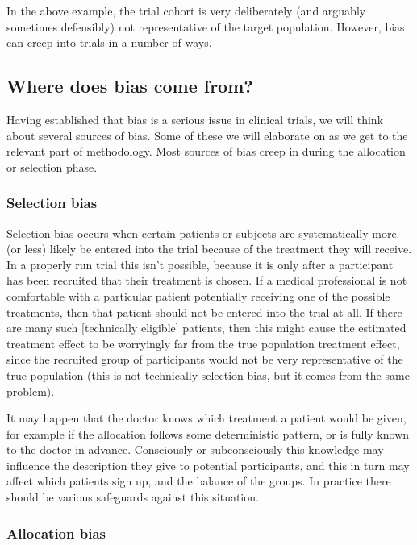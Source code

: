 \documentclass[
  openany]{book}
\theoremstyle{definition}
\theoremstyle{definition}
\theoremstyle{definition}
\theoremstyle{definition}
\theoremstyle{remark}
\begin{document}
In the above example, the trial cohort is very deliberately (and arguably sometimes defensibly) not representative of the target population. However, bias can creep into trials in a number of ways.

\subsection{Where does bias come from?}\label{where-does-bias-come-from}

Having established that bias is a serious issue in clinical trials, we will think about several sources of bias. Some of these we will elaborate on as we get to the relevant part of methodology. Most sources of bias creep in during the allocation or selection phase.

\subsubsection*{Selection bias}\label{selection-bias}

Selection bias occurs when certain patients or subjects are systematically more (or less) likely be entered into the trial because of the treatment they will receive. In a properly run trial this isn't possible, because it is only after a participant has been recruited that
their treatment is chosen. If a medical professional is not comfortable with a particular patient potentially receiving one of the possible treatments, then that patient should not be entered into the trial at all. If there are many such {[}technically eligible{]} patients, then this might cause the estimated treatment effect to be worryingly far from the true population treatment effect, since the recruited group of participants would not be very representative of the true population (this is not technically selection bias, but it comes from the same problem).

It may happen that the doctor knows which treatment a patient would be given, for example if the allocation follows some deterministic pattern, or is fully known to the doctor in advance. Consciously or subconsciously this knowledge may influence the description they give to potential participants, and this in turn may affect which patients sign up, and the balance of the groups. In practice there should be various safeguards against this situation.

\subsubsection*{Allocation bias}\label{allocation-bias}
\end{document}

